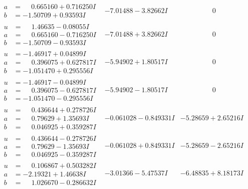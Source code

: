 \documentclass[1p]{elsarticle_modified}
\theoremstyle{definition}
\begin{document}
$$\begin{array}{c|c|c}
\begin{aligned}
a &= \phantom{-}0.665160 + 0.716250 I \\
b &= -1.50709 + 0.93593 I\end{aligned}
 & -7.01488 - 3.82662 I & \phantom{-0.000000 } 0 \\ \hline\begin{aligned}
u &= \phantom{-}1.46635 - 0.08055 I \\
a &= \phantom{-}0.665160 - 0.716250 I \\
b &= -1.50709 - 0.93593 I\end{aligned}
 & -7.01488 + 3.82662 I & \phantom{-0.000000 } 0 \\ \hline\begin{aligned}
u &= -1.46917 + 0.04899 I \\
a &= \phantom{-}0.396075 + 0.627817 I \\
b &= -1.051470 + 0.295556 I\end{aligned}
 & -5.94902 + 1.80517 I & \phantom{-0.000000 } 0 \\ \hline\begin{aligned}
u &= -1.46917 - 0.04899 I \\
a &= \phantom{-}0.396075 - 0.627817 I \\
b &= -1.051470 - 0.295556 I\end{aligned}
 & -5.94902 - 1.80517 I & \phantom{-0.000000 } 0 \\ \hline\begin{aligned}
u &= \phantom{-}0.436644 + 0.278726 I \\
a &= \phantom{-}0.79629 + 1.35693 I \\
b &= \phantom{-}0.046925 + 0.359287 I\end{aligned}
 & -0.061028 - 0.849331 I & -5.28659 + 2.65216 I \\ \hline\begin{aligned}
u &= \phantom{-}0.436644 - 0.278726 I \\
a &= \phantom{-}0.79629 - 1.35693 I \\
b &= \phantom{-}0.046925 - 0.359287 I\end{aligned}
 & -0.061028 + 0.849331 I & -5.28659 - 2.65216 I \\ \hline\begin{aligned}
u &= \phantom{-}0.106867 + 0.503282 I \\
a &= -2.19321 + 1.46638 I \\
b &= \phantom{-}1.026670 - 0.286632 I\end{aligned}
 & -3.01366 - 5.47537 I & -6.48835 + 8.18173 I\\

\end{array}$$
\end{document}
